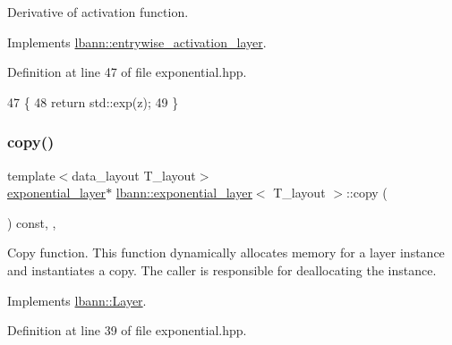 Derivative of activation function. 

Implements \hyperlink{classlbann_1_1entrywise__activation__layer_a7676a4c5060452a38264993554e79f8e}{lbann\+::entrywise\+\_\+activation\+\_\+layer}.



Definition at line 47 of file exponential.\+hpp.


\begin{DoxyCode}
47                                                             \{
48     \textcolor{keywordflow}{return} std::exp(z);
49   \}
\end{DoxyCode}
\mbox{\label{classlbann_1_1exponential__layer_ac1f8c1e00ceddeb059f9ee6dd77052af}} 
\subsubsection{\texorpdfstring{copy()}{copy()}}
{\footnotesize\ttfamily template$<$data\+\_\+layout T\+\_\+layout$>$ \\
\hyperlink{classlbann_1_1exponential__layer}{exponential\+\_\+layer}$\ast$ \hyperlink{classlbann_1_1exponential__layer}{lbann\+::exponential\+\_\+layer}$<$ T\+\_\+layout $>$\+::copy (\begin{DoxyParamCaption}{ }\end{DoxyParamCaption}) const\hspace{0.3cm}{\ttfamily [inline]}, {\ttfamily [override]}, {\ttfamily [virtual]}}

Copy function. This function dynamically allocates memory for a layer instance and instantiates a copy. The caller is responsible for deallocating the instance. 

Implements \hyperlink{classlbann_1_1Layer_af420f22bbac801c85483ade84588a23f}{lbann\+::\+Layer}.



Definition at line 39 of file exponential.\+hpp.


